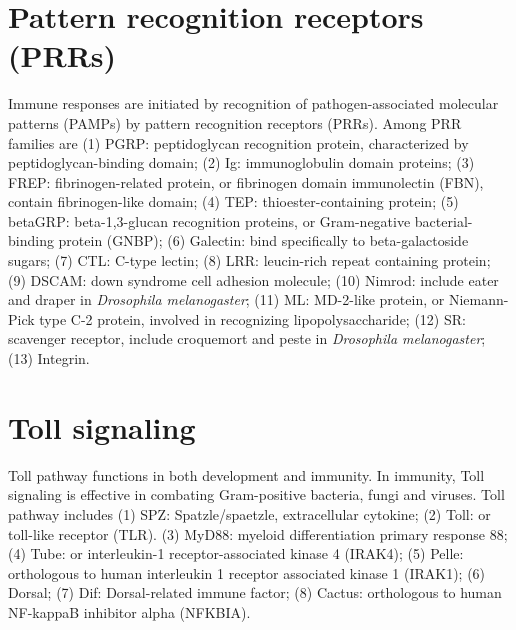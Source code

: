 \documentclass[11pt]{article}
\begin{document}
\begin{sloppypar}
\section{Pattern recognition receptors (PRRs)}
Immune responses are initiated by recognition of pathogen-associated molecular patterns (PAMPs) by pattern recognition receptors (PRRs). 
Among PRR families are 
\newline
(1) PGRP: peptidoglycan recognition protein, characterized by peptidoglycan-binding domain; \newline
(2) Ig: immunoglobulin domain proteins; \newline
(3) FREP: fibrinogen-related protein, or fibrinogen domain immunolectin (FBN), contain fibrinogen-like domain; \newline
(4) TEP: thioester-containing protein; \newline
(5) betaGRP: beta-1,3-glucan recognition proteins, or Gram-negative bacterial-binding protein (GNBP); \newline
(6) Galectin: bind specifically to beta-galactoside sugars; \newline
(7) CTL: C-type lectin; \newline
(8) LRR: leucin-rich repeat containing protein; \newline
(9) DSCAM: down syndrome cell adhesion molecule; \newline
(10) Nimrod: include eater and draper in \textit{Drosophila melanogaster}; \newline
(11) ML: MD-2-like protein, or Niemann-Pick type C-2 protein, involved in recognizing lipopolysaccharide; \newline
(12) SR: scavenger receptor, include croquemort and peste in \textit{Drosophila melanogaster}; \newline
(13) Integrin.

\section{Toll signaling}
Toll pathway functions in both development and immunity. 
In immunity, Toll signaling is effective in combating Gram-positive bacteria, fungi and viruses.
Toll pathway includes
\newline
(1) SPZ: Spatzle/spaetzle, extracellular cytokine; \newline
(2) Toll: or toll-like receptor (TLR). \newline 
(3) MyD88: myeloid differentiation primary response 88; \newline
(4) Tube: or interleukin-1 receptor-associated kinase 4 (IRAK4); \newline
(5) Pelle: orthologous to human interleukin 1 receptor associated kinase 1 (IRAK1); \newline
(6) Dorsal; \newline 
(7) Dif: Dorsal-related immune factor; \newline
(8) Cactus: orthologous to human NF-kappaB inhibitor alpha (NFKBIA).


\end{sloppypar}
\end{document}

